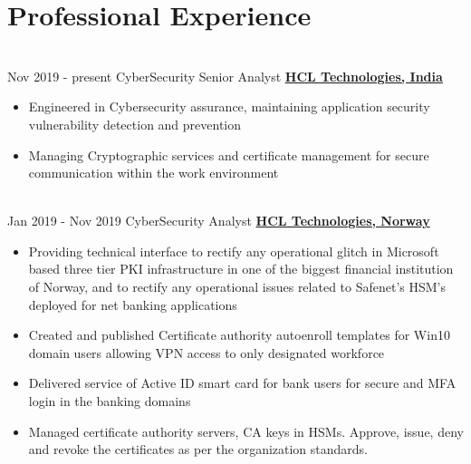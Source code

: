 \documentclass[letterpaper]{twentysecondcv} %
\begin{document}
        \makeprofile %
        \vspace{-4.5mm}
        \section*{{\color{pblue}\LARGE Professional Experience}}
        \vspace{-5mm}
        \begin{twenty}
            \\
        	\twentyitem
            	{Nov 2019 -}
        		{present}
                {CyberSecurity Senior Analyst}
                {\textbf{\href{https://www.hcltech.com/}{ HCL Technologies, India}}}
                {}
                {
                {\begin{itemize}
                 \item Engineered in Cybersecurity assurance, maintaining application security vulnerability detection and prevention
                 \item  Managing Cryptographic services and certificate management for secure communication within the work environment
                \end{itemize}}
                }
            \\
            \twentyitem
           		{Jan 2019 -}
        		{Nov 2019}
                {CyberSecurity Analyst}
                {\textbf{\href{https://www.hcltech.com/geo-presence/norway}{ HCL Technologies, Norway}}}
                {}
                {
                {\begin{itemize}
                    \item Providing technical interface to rectify any operational glitch in Microsoft based three tier PKI infrastructure in one of the biggest financial institution of Norway, and to rectify any operational issues related to Safenet's HSM's deployed for net banking applications 
                    \item Created and published Certificate authority autoenroll templates for Win10 domain users allowing VPN access to only designated workforce
                    \item  Delivered service of Active ID smart card for bank users for secure and MFA login in the banking domains
                    \item Managed certificate authority servers, CA keys in HSMs. Approve, issue, deny and revoke the certificates as per the organization standards.

\end{itemize}}}
\end{twenty}
\end{document}
